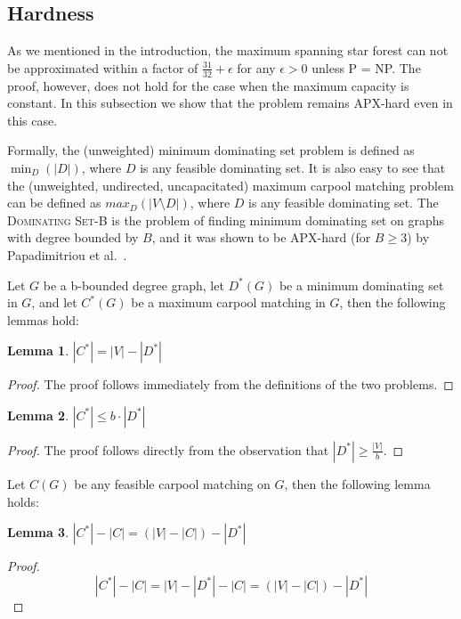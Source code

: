 \documentclass[draft]{article}
\newtheorem{lemma}{Lemma}
\begin{document}
	\subsection{Hardness}
	\label{sec:hardness}
As we mentioned in the introduction, the maximum spanning star forest can not 
be approximated within a factor of 
$\frac{31}{32} + \epsilon$ for any $\epsilon > 0$ unless P = NP.
The proof, however, does not hold for the case when the maximum capacity is
constant. 
In this subsection we show that the problem remains APX-hard even in this case.

Formally, the (unweighted)
minimum dominating set problem is defined as $\min_{D}(|D|)$,
where $D$ is any feasible dominating set.
It is also easy to see that the (unweighted, undirected, uncapacitated) 
maximum carpool matching problem can be defined as $max_{D}(|V \setminus D|)$, 
where $D$ is any feasible dominating set.
The \textsc{Dominating Set-B} is the problem of finding minimum dominating set on 
graphs with degree bounded by $B$,
and it was shown to be APX-hard (for $B \geq 3$) by 
Papadimitriou et al.~\cite{papadimitriou1988optimization}.

Let $G$ be a b-bounded degree graph,
let $D^*(G)$ be a minimum dominating set in $G$,
and let $C^*(G)$ be a maximum carpool matching in $G$, 
then the following lemmas hold:

\begin{lemma}
$|C^*| = |V| - |D^*|$
\end{lemma}

\begin{proof}
The proof follows immediately from the definitions of the two problems. 
\end{proof}

\begin{lemma}
\label{lm:optc_leq_boptd}
$|C^*| \leq b \cdot |D^*|$
\end{lemma}

\begin{proof}
The proof follows directly from the observation that $|D^*| \geq \frac{|V|}{b}$.
\end{proof}

Let $C(G)$ be any feasible carpool matching on $G$, then the following lemma holds:

\begin{lemma}
\label{lm:erreq}
$|C^*| - |C| = (|V| - |C|) - |D^*|$
\end{lemma}

\begin{proof}
$$
|C^*| - |C| 				= 
|V| - |D^*| - |C| 	= 
(|V| - |C|) - |D^*|
$$
\end{proof}
\end{document}
